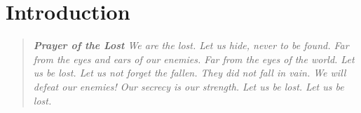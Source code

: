 \documentclass[letterpaper,serif]{rpg-module}
\begin{document}


\maketitle
          
%


\part{Introduction}
\label{introduction}

\begin{quote}
\emph{\textbf{Prayer of the Lost}\newline
We are the lost.\newline
Let us hide, never to be found. \newline
Far from the eyes and ears of our enemies. \newline
Far from the eyes of the world. \newline
Let us be lost. \newline
Let us not forget the fallen.\newline
They did not fall in vain.\newline
We will defeat our enemies!\newline
Our secrecy is our strength.\newline
Let us be lost.\newline
Let us be lost.}
\end{quote}
\end{document}
